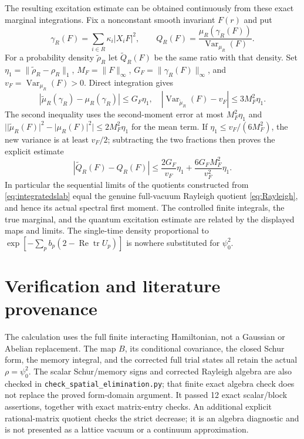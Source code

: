 \documentclass[11pt]{article}
\newcommand{\tr}{\operatorname{tr}}
\newcommand{\Rea}{\operatorname{Re}}
\newcommand{\Var}{\operatorname{Var}}
\begin{document}
The resulting excitation estimate can be obtained continuously from
these exact marginal integrations. Fix a nonconstant smooth invariant
$F(r)$ and put
\[
 \gamma_R(F)=\sum_{i\in R}\kappa_i|X_iF|^2,
 \qquad Q_R(F)=\frac{\mu_R(\gamma_R(F))}{\Var_{\mu_R}(F)}.
\]
For a probability density $\widetilde\rho_R$ let $\widetilde Q_R(F)$
be the same ratio with that density. Set
$\eta_1=\|\widetilde\rho_R-\rho_R\|_1$,
$M_F=\|F\|_\infty$, $G_F=\|\gamma_R(F)\|_\infty$, and
$v_F=\Var_{\mu_R}(F)>0$. Direct integration gives
\[
 |\widetilde\mu_R(\gamma_R)-\mu_R(\gamma_R)|\leq G_F\eta_1,
 \quad
 |\Var_{\widetilde\mu_R}(F)-v_F|\leq3M_F^2\eta_1.
\]
The second inequality uses the second-moment error at most
$M_F^2\eta_1$ and
$\bigl|\lvert\widetilde\mu_R(F)\rvert^2-\lvert\mu_R(F)\rvert^2\bigr|
\leq2M_F^2\eta_1$ for the mean term. If
$\eta_1\leq v_F/(6M_F^2)$, the new variance is at least $v_F/2$;
subtracting the two fractions then proves the explicit estimate
\begin{equation}\label{eq:quotienterror}
 |\widetilde Q_R(F)-Q_R(F)|
 \leq\frac{2G_F}{v_F}\eta_1
      +\frac{6G_FM_F^2}{v_F^2}\eta_1.
\end{equation}
In particular the sequential limits of the quotients constructed from
\eqref{eq:integratedslab} equal the genuine full-vacuum Rayleigh
quotient \eqref{eq:Rayleigh}, and hence its actual spectral first
moment. The controlled finite integrals, the true marginal, and the
quantum excitation estimate are related by the displayed maps and
limits. The single-time density proportional to
$\exp[-\sum_pb_p(2-\Rea\tr U_p)]$ is nowhere substituted for
$\psi_0^2$.

\section{Verification and literature provenance}

The calculation uses the full finite interacting Hamiltonian, not a
Gaussian or Abelian replacement. The map $B$, its conditional
covariance, the closed Schur form, the memory integral, and the
corrected full trial states all retain the actual $\rho=\psi_0^2$.
The scalar Schur/memory signs and corrected Rayleigh algebra are also
checked in \texttt{check\_spatial\_elimination.py}; that finite exact
algebra check does not replace the proved form-domain argument.
It passed 12 exact scalar/block assertions, together with exact
matrix-entry checks. An additional explicit rational-matrix quotient
checks the strict decrease; it is an algebra diagnostic and is not
presented as a lattice vacuum or a continuum approximation.
\end{document}
